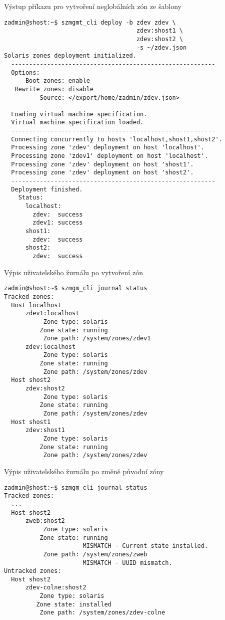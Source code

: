 \begin{listing}[ht]
  \caption{Výstup příkazu pro vytvoření neglobálních zón ze šablony}
  \begin{verbatim}
zadmin@shost:~$ szmgmt_cli deploy -b zdev zdev \
                                     zdev:shost1 \
                                     zdev:shost2 \
                                     -s ~/zdev.json 
Solaris zones deployment initialized.
  ---------------------------------------------------------
  Options:
      Boot zones: enable
   Rewrite zones: disable
          Source: </export/home/zadmin/zdev.json>
  ---------------------------------------------------------
  Loading virtual machine specification.
  Virtual machine specification loaded.
  ---------------------------------------------------------
  Connecting concurrently to hosts 'localhost,shost1,shost2'.
  Processing zone 'zdev' deployment on host 'localhost'.
  Processing zone 'zdev1' deployment on host 'localhost'.
  Processing zone 'zdev' deployment on host 'shost1'.
  Processing zone 'zdev' deployment on host 'shost2'.
  ---------------------------------------------------------
  Deployment finished.
    Status:
      localhost:
        zdev:  success
        zdev1: success
      shost1:
        zdev:  success
      shost2:
        zdev:  success
  \end{verbatim}
  \label{code:test:deployment}
\end{listing}

\begin{listing}[ht]
  \caption{Výpis uživatelského žurnálu po vytvoření zón}  
  \begin{verbatim}
zadmin@shost:~$ szmgm_cli journal status
Tracked zones:
  Host localhost
      zdev1:localhost
           Zone type: solaris
          Zone state: running
           Zone path: /system/zones/zdev1
      zdev:localhost
           Zone type: solaris
          Zone state: running
           Zone path: /system/zones/zdev
  Host shost2
      zdev:shost2
           Zone type: solaris
          Zone state: running                      
           Zone path: /system/zones/zdev
  Host shost1
      zdev:shost1
           Zone type: solaris
          Zone state: running
           Zone path: /system/zones/zdev
  \end{verbatim}
  \label{code:test:journal}
\end{listing}

\begin{listing}[ht]
  \caption{Výpis uživatelského žurnálu po změně původní zóny}  
  \begin{verbatim}
zadmin@shost:~$ szmgm_cli journal status
Tracked zones:
  ...
  Host shost2
      zweb:shost2
           Zone type: solaris
          Zone state: running
                      MISMATCH - Current state installed.
           Zone path: /system/zones/zweb
                      MISMATCH - UUID mismatch.
Untracked zones:
  Host shost2
      zdev-colne:shost2
          Zone type: solaris
         Zone state: installed
          Zone path: /system/zones/zdev-colne
  \end{verbatim}
  \label{code:test:journal:change}
\end{listing}

